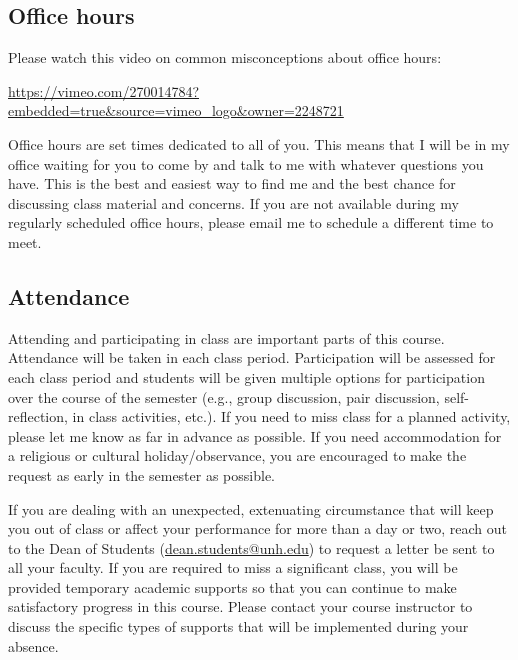 \documentclass[
  letterpaper,
  DIV=11,
  numbers=noendperiod]{scrreprt}
\begin{document}

\hypertarget{office-hours}{%
\subsection*{Office hours}\label{office-hours}}

Please watch this video on common misconceptions about office hours:

\url{https://vimeo.com/270014784?embedded=true\&source=vimeo_logo\&owner=2248721}

Office hours are set times dedicated to all of you. This means that I
will be in my office waiting for you to come by and talk to me with
whatever questions you have. This is the best and easiest way to find me
and the best chance for discussing class material and concerns. If you
are not available during my regularly scheduled office hours, please
email me to schedule a different time to meet.

\hypertarget{attendance}{%
\subsection*{Attendance}\label{attendance}}

Attending and participating in class are important parts of this course.
Attendance will be taken in each class period. Participation will be
assessed for each class period and students will be given multiple
options for participation over the course of the semester (e.g., group
discussion, pair discussion, self-reflection, in class activities,
etc.). If you need to miss class for a planned activity, please let me
know as far in advance as possible. If you need accommodation for a
religious or cultural holiday/observance, you are encouraged to make the
request as early in the semester as possible.

If you are dealing with an unexpected, extenuating circumstance that
will keep you out of class or affect your performance for more than a
day or two, reach out to the Dean of Students
(\url{dean.students@unh.edu}) to request a letter be sent to all your
faculty. If you are required to miss a significant class, you will be
provided temporary academic supports so that you can continue to make
satisfactory progress in this course. Please contact your course
instructor to discuss the specific types of supports that will be
implemented during your absence.
\end{document}
